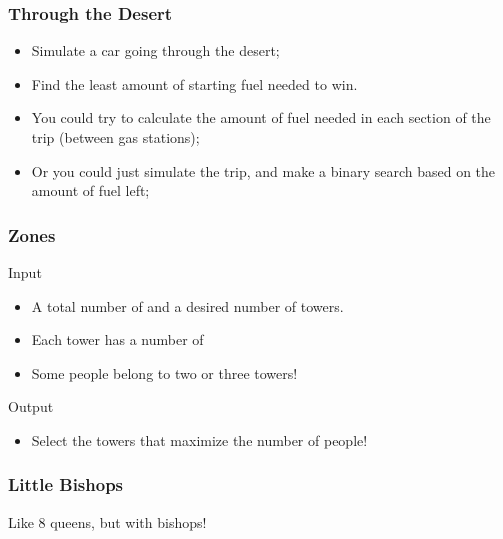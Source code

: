 \begin{frame}
  \frametitle{Through the Desert}
  {\small
    \begin{block}{}
      \begin{itemize}
      \item Simulate a car going through the desert;
      \item Find the least amount of starting fuel needed to win.
      \end{itemize}
    \end{block}

    \begin{itemize}
    \item You could try to calculate the amount of fuel needed in each
      section of the trip (between gas stations);
    \item Or you could just simulate the trip, and make a binary
      search based on the amount of fuel left;
    \end{itemize}
  }
\end{frame}

\begin{frame}
  \frametitle{Zones}
  \begin{block}{Input}
    \begin{itemize}
      \item A total number of  and a desired number of towers.
      \item Each tower has a number of 
      \item Some people belong to two or three towers!
    \end{itemize}
  \end{block}

  \begin{exampleblock}{Output}
    \begin{itemize}
      \item Select the towers that maximize the number of people!
    \end{itemize}
  \end{exampleblock}
\end{frame}

\begin{frame}
  \frametitle{Little Bishops}

  Like 8 queens, but with bishops!
\end{frame}
